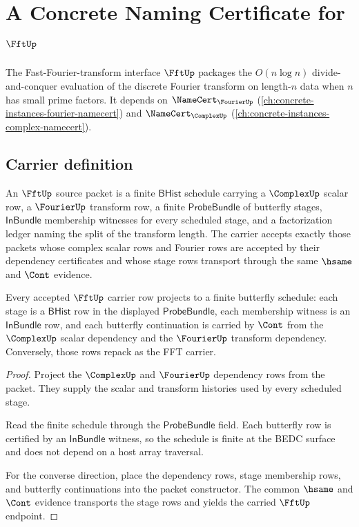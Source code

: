 \chapter{A Concrete Naming Certificate for $\FftUp$}
\label{ch:concrete-instances-fft-namecert}

The Fast-Fourier-transform interface $\FftUp$ packages the $O(n \log n)$ divide-and-conquer evaluation of the discrete Fourier transform on length-$n$ data when $n$ has small prime factors. It depends on $\NameCert_{\FourierUp}$ (\autoref{ch:concrete-instances-fourier-namecert}) and $\NameCert_{\ComplexUp}$ (\autoref{ch:concrete-instances-complex-namecert}).

\section{Carrier definition}
\label{sec:fft-carrier}

\begin{definition}
\label{def:fft-bhist-source-packet}
An $\FftUp$ source packet is a finite $\mathsf{BHist}$ schedule carrying a
$\ComplexUp$ scalar row, a $\FourierUp$ transform row, a finite
$\mathsf{ProbeBundle}$ of butterfly stages, $\mathsf{InBundle}$ membership
witnesses for every scheduled stage, and a factorization ledger naming the
split of the transform length. The carrier accepts exactly those packets whose
complex scalar rows and Fourier rows are accepted by their dependency
certificates and whose stage rows transport through the same $\hsame$ and
$\Cont$ evidence.
\end{definition}

\begin{theorem}
\label{thm:fft-carrier-butterfly-obligation}
Every accepted $\FftUp$ carrier row projects to a finite butterfly schedule:
each stage is a $\mathsf{BHist}$ row in the displayed
$\mathsf{ProbeBundle}$, each membership witness is an
$\mathsf{InBundle}$ row, and each butterfly continuation is carried by
$\Cont$ from the $\ComplexUp$ scalar dependency and the $\FourierUp$ transform
dependency. Conversely, those rows repack as the FFT carrier.
\end{theorem}
\begin{proof}
Project the $\ComplexUp$ and $\FourierUp$ dependency rows from the packet.
They supply the scalar and transform histories used by every scheduled stage.

Read the finite schedule through the $\mathsf{ProbeBundle}$ field. Each
butterfly row is certified by an $\mathsf{InBundle}$ witness, so the schedule
is finite at the BEDC surface and does not depend on a host array traversal.

For the converse direction, place the dependency rows, stage membership rows,
and butterfly continuations into the packet constructor. The common $\hsame$
and $\Cont$ evidence transports the stage rows and yields the carried
$\FftUp$ endpoint.
\end{proof}

